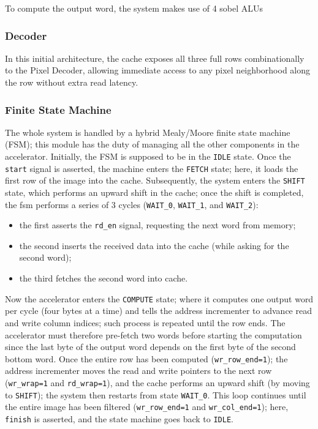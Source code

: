 To compute the output word, the system makes use of 4 sobel ALUs

\subsubsection{Decoder}

In this initial architecture, the cache exposes all three full rows combinationally to the Pixel Decoder, allowing immediate access to any pixel neighborhood along the row without extra read latency.

\subsubsection{Finite State Machine}

The whole system is handled by a hybrid Mealy/Moore finite state machine (FSM); this module has the duty of managing all the other components in the accelerator. Initially, the FSM is supposed to be in the \texttt{IDLE} state. Once the \texttt{start} signal is asserted, the machine enters the \texttt{FETCH} state; here, it loads the first row of the image into the cache. Subsequently, the system enters the \texttt{SHIFT} state, which performs an upward shift in the cache; once the shift is completed, the fsm performs a series of 3 cycles (\texttt{WAIT\_0}, \texttt{WAIT\_1}, and \texttt{WAIT\_2}): 
\begin{itemize}
    \item the first asserts the \texttt{rd\_en} signal, requesting the next word from memory;
    \item the second inserts the received data into the cache (while asking for the second word);
    \item the third fetches the second word into cache.
\end{itemize}
Now the accelerator enters the \texttt{COMPUTE} state; where it computes one output word per cycle (four bytes at a time) and tells the address incrementer to advance read and write column indices; such process is repeated until the row ends. The accelerator must therefore pre-fetch two words before starting the computation since the last byte of the output word depends on the first byte of the second bottom word. Once the entire row has been computed (\texttt{wr\_row\_end=1}); the address incrementer moves the read and write pointers to the next row (\texttt{wr\_wrap=1} and \texttt{rd\_wrap=1}), and the cache performs an upward shift (by moving to \texttt{SHIFT}); the system then restarts from state \texttt{WAIT\_0}. This loop continues until the entire image has been filtered (\texttt{wr\_row\_end=1} and \texttt{wr\_col\_end=1}); here, \texttt{finish} is asserted, and the state machine goes back to \texttt{IDLE}.

